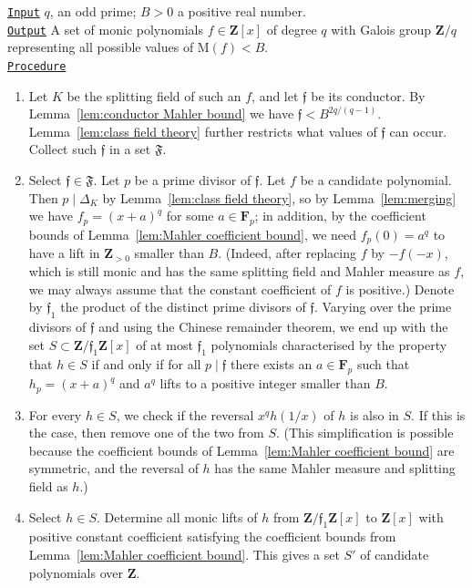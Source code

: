 \documentclass[12pt,reqno]{amsart}
\theoremstyle{definition}
\theoremstyle{plain}
\theoremstyle{definition}
\newcommand{\mf}{\mathfrak}
\newcommand{\Z}{\mathbf{Z}}
\newcommand{\FF}{\mathbf{F}}
\newcommand{\MM}{\mathrm{M}}
\begin{document}
\noindent \underline{\texttt{Input}} $q$, an odd prime; $B>0$ a positive real number. \\[2mm]
\underline{\texttt{Output}} A set of monic polynomials $f\in \Z[x]$ of degree $q$ with Galois group $\Z/q$ representing all possible values of $\MM(f) < B$. \\[2mm]
\underline{\texttt{Procedure}} 
\begin{enumerate}
\item \label{alg-i} Let $K$ be the splitting field of such an $f$, and let $\mf{f}$ be its conductor. By Lemma~\ref{lem:conductor Mahler bound} we have $\mf{f} < B^{2q/(q-1)}$. Lemma~\ref{lem:class field theory} further restricts what values of $\mf{f}$ can occur. Collect such $\mf{f}$ in a set $\mf{F}$. 
\item\label{alg-ii}  Select $\mf{f} \in \mf{F}$. 
Let $p$ be a prime divisor of $\mf{f}$. Let $f$ be a candidate polynomial. Then $p \mid \Delta_K$ by Lemma~\ref{lem:class field theory}, so by Lemma~\ref{lem:merging} we have $f_p = (x+a)^q$ for some $a \in \FF_p$; in addition, by the coefficient bounds of Lemma~\ref{lem:Mahler coefficient bound}, we need $f_p(0) = a^q$ to have a lift in $\Z_{>0}$ smaller than $B$. (Indeed, after replacing $f$ by $-f(-x)$, which is still monic and has the same splitting field and Mahler measure as $f$, we may always assume that the constant coefficient of $f$ is positive.) Denote by $\mf{f}_1$ the product of the distinct prime divisors of $\mf{f}$. Varying over the prime divisors of $\mf{f}$ and using the Chinese remainder theorem, we end up with the set $S \subset \Z/\mf{f}_1\Z[x]$ of at most $\mf{f}_1$ polynomials characterised by the property that $h \in S$ if and only if for all $p \mid \mf{f}$ there exists an $a \in \FF_p$ such that $h_p = (x+a)^q$ and $a^q$ lifts to a positive integer smaller than $B$.

\item \label{alg-iii} For every $h \in S$, we check if the reversal $x^q h(1/x)$ of $h$ is also in $S$. If this is the case, then remove one of the two from $S$. (This simplification is possible because the coefficient bounds of Lemma~\ref{lem:Mahler coefficient bound} are symmetric, and the reversal of $h$ has the same Mahler measure and splitting field as $h$.)

\item \label{alg-iv} Select $h \in S$. Determine all monic lifts of $h$ from $\Z/\mf{f}_1\Z[x]$ to $\Z[x]$ with positive constant coefficient satisfying the coefficient bounds from Lemma~\ref{lem:Mahler coefficient bound}. This gives a set $S'$ of candidate polynomials over $\Z$.


\end{enumerate}
\end{document}
